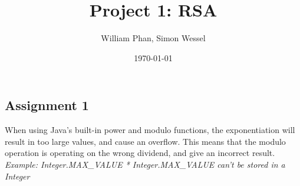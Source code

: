 \documentclass[11pt,a4paper]{article}
\title{Project 1: RSA} %
\author{William Phan, Simon Wessel}
\date{\today} %
\begin{document}
\maketitle %

\setcounter{secnumdepth}{0}

\subsection{Assignment 1}
When using Java's built-in power and modulo functions, the exponentiation will result in too large values, and cause an overflow. This means that the modulo operation is operating on the wrong dividend, and give an incorrect result. 
\\
\textit{Example: Integer.MAX\_VALUE * Integer.MAX\_VALUE can't be stored in a Integer}
\end{document}
